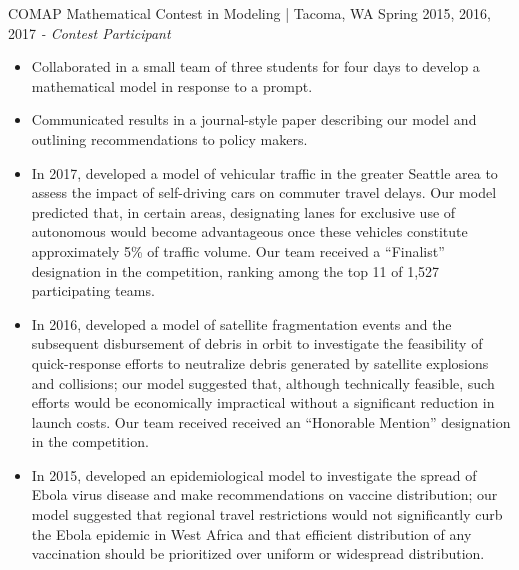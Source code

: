 COMAP Mathematical Contest in Modeling | Tacoma, WA \hfill Spring 2015, 2016, 2017 \newline
\textit{- Contest Participant} \\
\vspace{-4.5mm}
\begin{itemize}
  \item Collaborated in a small team of three students for four days to develop a mathematical model in response to a prompt.
  \item Communicated results in a journal-style paper describing our model and outlining recommendations to policy makers.
  \item In 2017, developed a model of vehicular traffic in the greater Seattle area to assess the impact of self-driving cars on commuter travel delays. Our model predicted that, in certain areas, designating lanes for exclusive use of autonomous would become advantageous once these vehicles constitute approximately 5\% of traffic volume. Our team received a ``Finalist'' designation in the competition, ranking among the top 11 of 1,527 participating teams.
  \item In 2016, developed a model of satellite fragmentation events and the subsequent disbursement of debris in orbit to investigate the feasibility of quick-response efforts to neutralize debris generated by satellite explosions and collisions; our model suggested that, although technically feasible, such efforts would be economically impractical without a significant reduction in launch costs. Our team received received an ``Honorable Mention'' designation in the competition.
  \item In 2015, developed an epidemiological model to investigate the spread of Ebola virus disease and make recommendations on vaccine distribution; our model suggested that regional travel restrictions would not significantly curb the Ebola epidemic in West Africa and that efficient distribution of any vaccination should be prioritized over uniform or widespread distribution.
\end{itemize}
\vspace{-3.5mm}

